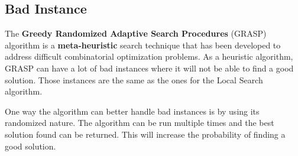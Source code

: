 
\subsection{Bad Instance}

The \textbf{Greedy Randomized Adaptive Search Procedures} (GRASP) algorithm is a
\textbf{meta-heuristic} search technique that has been developed to address
difficult combinatorial optimization problems. As a heuristic algorithm, GRASP
can have a lot of bad instances where it will not be able to find a good solution.
Those instances are the same as the ones for the Local Search algorithm.
\bigskip

One way the algorithm can better handle bad instances is by using its randomized
nature. The algorithm can be run multiple times and the best solution found can
be returned. This will increase the probability of finding a good solution.